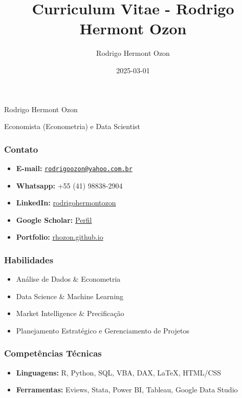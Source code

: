 \documentclass[
  letterpaper,
  DIV=11,
  numbers=noendperiod]{scrartcl}
\title{Curriculum Vitae - Rodrigo Hermont Ozon}
\author{Rodrigo Hermont Ozon}
\date{2025-03-01}
\providecommand{\tightlist}{%
  \setlength{\itemsep}{0pt}\setlength{\parskip}{0pt}}\usepackage{longtable,booktabs,array}
\begin{document}
\maketitle


Rodrigo Hermont Ozon

Economista (Econometria) e Data Scientist

\subsubsection{Contato}\label{contato}

\begin{itemize}
\tightlist
\item
  \textbf{E-mail:}
  \href{mailto:rodrigoozon@yahoo.com.br}{\nolinkurl{rodrigoozon@yahoo.com.br}}
\item
  \textbf{Whatsapp:} +55 (41) 98838-2904
\item
  \textbf{LinkedIn:}
  \href{https://www.linkedin.com/in/rodrigohermontozon/}{rodrigohermontozon}
\item
  \textbf{Google Scholar:}
  \href{https://scholar.google.com/citations?hl=en&user=hPcIR9oAAAAJ}{Perfil}
\item
  \textbf{Portfolio:} \href{https://rhozon.github.io/}{rhozon.github.io}
\end{itemize}

\subsubsection{Habilidades}\label{habilidades}

\begin{itemize}
\tightlist
\item
  Análise de Dados \& Econometria
\item
  Data Science \& Machine Learning
\item
  Market Intelligence \& Precificação
\item
  Planejamento Estratégico e Gerenciamento de Projetos
\end{itemize}

\subsubsection{Competências Técnicas}\label{competuxeancias-tuxe9cnicas}

\begin{itemize}
\tightlist
\item
  \textbf{Linguagens:} R, Python, SQL, VBA, DAX, LaTeX, HTML/CSS
\item
  \textbf{Ferramentas:} Eviews, Stata, Power BI, Tableau, Google Data
  Studio
\end{itemize}
\end{document}
